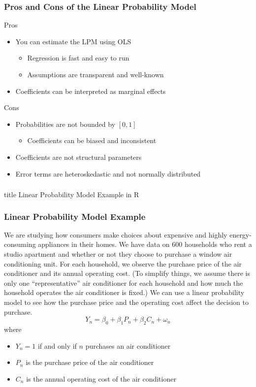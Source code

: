 \documentclass{beamer}\usepackage[]{graphicx}\usepackage[]{color}
\begin{document}
\begin{frame}\frametitle{Pros and Cons of the Linear Probability Model}
    Pros
    \begin{itemize}
    	\item You can estimate the LPM using OLS
    	\begin{itemize}
    		\item Regression is fast and easy to run
    		\item Assumptions are transparent and well-known
    	\end{itemize}
    	\item Coefficients can be interpreted as marginal effects
    \end{itemize}
    \vspace{3ex}
    Cons
    \begin{itemize}
    	\item Probabilities are not bounded by $[0, 1]$
    	\begin{itemize}
    		\item Coefficients can be biased and inconsistent
    	\end{itemize}
    	\item Coefficients are not structural parameters
    	\item Error terms are heteroskedastic and not normally distributed
    \end{itemize}
\end{frame}

\begin{frame}\frametitle{}
    \vfill
    \centering
    \begin{beamercolorbox}[center]{title}
        \Large Linear Probability Model Example in R
    \end{beamercolorbox}
    \vfill
\end{frame}

\begin{frame}\frametitle{Linear Probability Model Example}
    We are studying how consumers make choices about expensive and highly energy-consuming appliances in their homes. We have data on 600 households who rent a studio apartment and whether or not they choose to purchase a window air conditioning unit. For each household, we observe the purchase price of the air conditioner and its annual operating cost. (To simplify things, we assume there is only one ``representative'' air conditioner for each household and how much the household operates the air conditioner is fixed.) We can use a linear probability model to see how the purchase price and the operating cost affect the decision to purchase.
    $$Y_n = \beta_0 + \beta_1 P_n + \beta_2 C_n + \omega_n$$
    where
    \begin{itemize}
    	\item $Y_n = 1$ if and only if $n$ purchases an air conditioner
    	\item $P_n$ is the purchase price of the air conditioner
    	\item $C_n$ is the annual operating cost of the air conditioner
    \end{itemize}
\end{frame}
\end{document}
